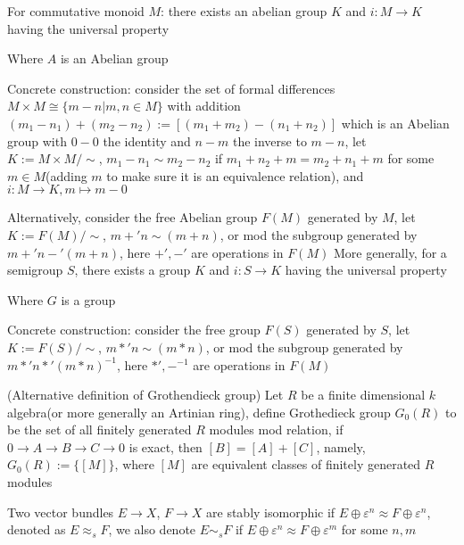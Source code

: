 \documentclass[../main.tex]{subfiles}
\begin{document}
\begin{definition}\label{Grothendieck group}
For commutative monoid $M$: there exists an abelian group $K$ and $i: M\to K$ having the universal property
Where $A$ is an Abelian group \par
Concrete construction: consider the set of formal differences $M\times M\cong\{m-n|m,n\in M\}$ with addition $(m_1-n_1)+(m_2-n_2):=[(m_1+m_2)-(n_1+n_2)]$ which is an Abelian group with $0-0$ the identity and $n-m$ the inverse to $m-n$, let $K:=M\times M/\sim$, $m_1-n_1\sim m_2-n_2$ if $m_1+n_2+m=m_2+n_1+m$ for some $m\in M$(adding $m$ to make sure it is an equivalence relation), and $i:M\to K, m\mapsto m-0$ \par
Alternatively, consider the free Abelian group $F(M)$ generated by $M$, let $K:=F(M)/\sim$, $m+'n\sim(m+n)$, or mod the subgroup generated by $m+'n-'(m+n)$, here $+',-'$ are operations in $F(M)$
More generally, for a semigroup $S$, there exists a group $K$ and $i: S\to K$ having the universal property
Where $G$ is a group \par
Concrete construction: consider the free group $F(S)$ generated by $S$, let $K:=F(S)/\sim$, $m*'n\sim(m*n)$, or mod the subgroup generated by $m*'n*'(m*n)^{-1}$, here $*', -^{-1}$  are operations in $F(M)$
\end{definition}

\begin{definition}(Alternative definition of Grothendieck group)
Let $R$ be a finite dimensional $k$ algebra(or more generally an Artinian ring), define Grothedieck group $G_0(R)$ to be the set of all finitely generated $R$ modules mod relation, if $0\to A\to B\to C\to0$ is exact, then $[B]=[A]+[C]$, namely, $G_0(R):=\{[M]\}$, where $[M]$ are equivalent classes of finitely generated $R$ modules
\end{definition}

\begin{definition}
Two vector bundles $E\to X$, $F\to X$ are stably isomorphic if $E\oplus\varepsilon^n\approx F\oplus\varepsilon^n$, denoted as $E\approx_s F$, we also denote $E\sim_s F$ if $E\oplus\varepsilon^n\approx F\oplus\varepsilon^m$ for some $n,m$
\end{definition}
\end{document}
